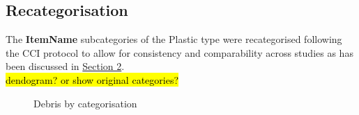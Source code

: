 \documentclass[10pt]{article}\usepackage[]{graphicx}\usepackage[]{color}
\begin{document}
\pagebreak
\subsection{Recategorisation}\label{recategorisation}

The \textbf{ItemName} subcategories of the Plastic type were recategorised following the CCI protocol to allow for consistency and comparability across studies as has been discussed in \hyperref[research]{Section 2}.\\

\hl{dendogram? or show original categories?}\\





\begin{figure}[H] 
\begin{center}

\caption {Debris by categorisation}
\label{figE}
\end {center}
\end {figure}
\end{document}
